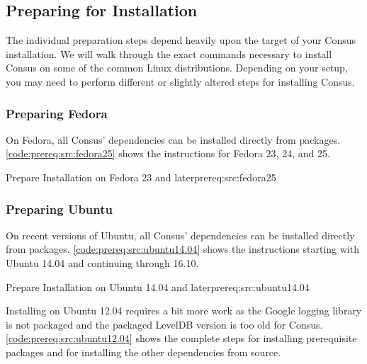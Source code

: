 \subsection{Preparing for Installation}

The individual preparation steps depend heavily upon the target of your Consus
installation.  We will walk through the exact commands necessary to install
Consus on some of the common Linux distributions.  Depending on your setup, you
may need to perform different or slightly altered steps for installing Consus.


\subsubsection*{Preparing Fedora}

On Fedora, all Consus' dependencies can be installed directly from packages.
\cref{code:prereq:src:fedora25} shows the instructions for Fedora 23, 24, and
25.

%
{Prepare Installation on Fedora 23 and later}{prereq:src:fedora25}

\subsubsection*{Preparing Ubuntu}

On recent versions of Ubuntu, all Consus' dependencies can be installed directly
from packages.  \cref{code:prereq:src:ubuntu14.04} shows the instructions
starting with Ubuntu 14.04 and continuing through 16.10.

%
{Prepare Installation on Ubuntu 14.04 and later}{prereq:src:ubuntu14.04}

Installing on Ubuntu 12.04 requires a bit more work as the Google logging
library is not packaged and the packaged LevelDB version is too old for Consus.
\cref{code:prereq:src:ubuntu12.04} shows the complete steps for installing
prerequisite packages and for installing the other dependencies from source.

